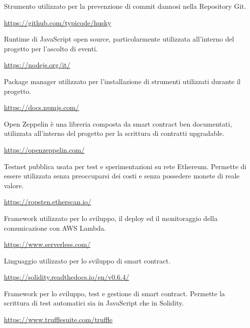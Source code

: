 	Strumento utilizzato per la prevenzione di commit dannosi nella Repository Git.
	\begin{center}
		\url{https://github.com/typicode/husky}
	\end{center}

	Runtime di JavaScript open source, particolarmente utilizzata all'interno del progetto per l'ascolto di eventi.
	\begin{center}
		\url{https://nodejs.org/it/}
	\end{center}

	Package manager utilizzato per l'installazione di strumenti utilizzati durante il progetto.
	\begin{center}
		\url{https://docs.npmjs.com/}
	\end{center}

	Open Zeppelin è una libreria composta da smart contract ben documentati, utilizzata all'interno del progetto per la scrittura di contratti upgradable.
	\begin{center}
		\url{https://openzeppelin.com/}
	\end{center}

	Testnet pubblica usata per test e sperimentazioni su rete Ethereum. Permette di essere utilizzata senza preoccuparsi dei costi e senza possedere monete di reale valore.
	\begin{center}
		\url{https://ropsten.etherscan.io/}
	\end{center}

	Framework utilizzato per lo sviluppo, il deploy ed il monitoraggio della comunicazione con AWS Lambda.
	\begin{center}
		\url{https://www.serverless.com/}
	\end{center}

	Linguaggio utilizzato per lo sviluppo di smart contract.
	\begin{center}
		\url{https://solidity.readthedocs.io/en/v0.6.4/}
	\end{center}

	Framework per lo sviluppo, test e gestione di smart contract. Permette la scrittura di test automatici sia in JavaScript che in Solidity.
	\begin{center}
		\url{https://www.trufflesuite.com/truffle}
	\end{center}

